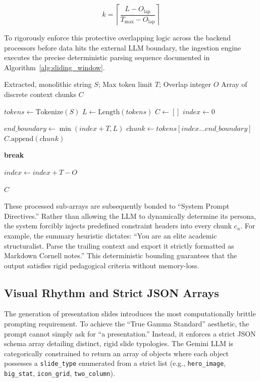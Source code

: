 \begin{equation}
    k = \left\lceil \frac{L - O_{\text{lap}}}{T_{\max} - O_{\text{lap}}} \right\rceil
\end{equation}

To rigorously enforce this protective overlapping logic across the backend processors before data hits the external LLM boundary, the ingestion engine executes the precise deterministic parsing sequence documented in Algorithm~\ref{alg:sliding_window}.

\begin{algorithm}[htbp]
\caption{Sliding Window Context Overlap Extraction}
\label{alg:sliding_window}
\begin{algorithmic}[1]
    \REQUIRE Extracted, monolithic string $S$; Max token limit $T$; Overlap integer $O$
    \ENSURE Array of discrete context chunks $C$
    
    \STATE $\textit{tokens} \leftarrow \text{Tokenize}(S)$
    \STATE $L \leftarrow \text{Length}(\textit{tokens})$
    \STATE $C \leftarrow [ ]$
    \STATE $\textit{index} \leftarrow 0$
    
        \STATE $\textit{end\_boundary} \leftarrow \min(\textit{index} + T, L)$
        \STATE $\textit{chunk} \leftarrow \textit{tokens}[\textit{index} \dots \textit{end\_boundary}]$
        \STATE $C\text{.append}(\textit{chunk})$
        
            \STATE \textbf{break}
        \ENDIF
        
        \STATE $\textit{index} \leftarrow \textit{index} + T - O$ 
    \ENDWHILE
    
    \RETURN $C$
\end{algorithmic}
\end{algorithm}


These processed sub-arrays are subsequently bonded to ``System Prompt Directives.'' Rather than allowing the LLM to dynamically determine its persona, the system forcibly injects predefined constraint headers into every chunk $c_n$. For example, the summary heuristic dictates: ``You are an elite academic structuralist. Parse the trailing context and export it strictly formatted as Markdown Cornell notes.'' This deterministic bounding guarantees that the output satisfies rigid pedagogical criteria without memory-loss.

\subsection{Visual Rhythm and Strict JSON Arrays}
The generation of presentation slides introduces the most computationally brittle prompting requirement. To achieve the ``True Gamma Standard'' aesthetic, the prompt cannot simply ask for ``a presentation.'' Instead, it enforces a strict JSON schema array detailing distinct, rigid slide typologies. The Gemini LLM is categorically constrained to return an array of objects where each object possesses a \texttt{slide\_type} enumerated from a strict list (e.g., \texttt{hero\_image}, \texttt{big\_stat}, \texttt{icon\_grid}, \texttt{two\_column}).

